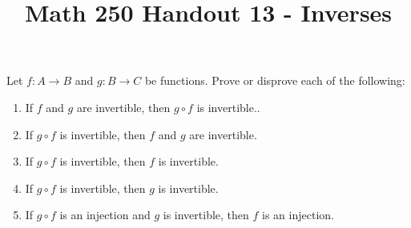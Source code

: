 \documentclass[12pt, reqno]{amsart}
\begin{document}
\title[Math 250 Handout 13 - Inverses]{Math 250 Handout 13 - Inverses}\maketitle


 Let $f\colon A \to B$ and $g \colon B \to C$ be functions. Prove or
  disprove each of the following:
  \begin{enumerate}
  \item If $f$ and $g$ are invertible, then $g \circ f$ is invertible..
  \item If $g \circ f$ is invertible, then $f$ and $g$ are invertible.
  \item If $g \circ f$ is invertible, then $f$ is invertible.
  \item If $g \circ f$ is invertible, then $g$ is invertible.
  \item If $g \circ f$ is an injection and $g$ is invertible, then $f$ is an
    injection.
  \end{enumerate}
\end{document}
